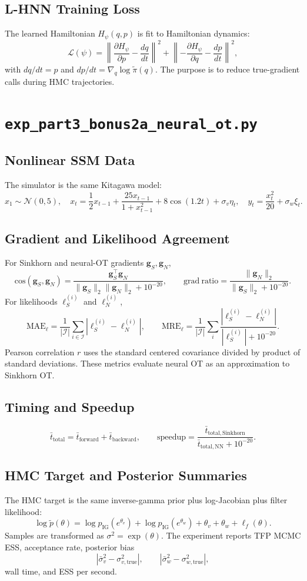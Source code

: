 \documentclass[11pt]{article}
\newcommand{\code}[1]{\texttt{#1}}
\begin{document}
\subsection*{L-HNN Training Loss}
The learned Hamiltonian \(H_\psi(q,p)\) is fit to Hamiltonian dynamics:
\[
\mathcal L(\psi)
=\left\|\frac{\partial H_\psi}{\partial p}-\frac{dq}{dt}\right\|^2
+\left\|-\frac{\partial H_\psi}{\partial q}-\frac{dp}{dt}\right\|^2,
\]
with \(dq/dt=p\) and \(dp/dt=\nabla_q\log\tilde\pi(q)\). The purpose is to reduce true-gradient calls during HMC trajectories.

\section{\code{exp\_part3\_bonus2a\_neural\_ot.py}}
\subsection*{Nonlinear SSM Data}
The simulator is the same Kitagawa model:
\[
x_1\sim\mathcal N(0,5),\quad
x_t=\frac12x_{t-1}+\frac{25x_{t-1}}{1+x_{t-1}^2}+8\cos(1.2t)+\sigma_v\eta_t,\quad
y_t=\frac{x_t^2}{20}+\sigma_w\xi_t.
\]

\subsection*{Gradient and Likelihood Agreement}
For Sinkhorn and neural-OT gradients \(\bm g_S,\bm g_N\),
\[
\mathrm{cos}(\bm g_S,\bm g_N)
=\frac{\bm g_S^\top\bm g_N}{\|\bm g_S\|_2\|\bm g_N\|_2+10^{-20}},
\qquad
\mathrm{grad\ ratio}=\frac{\|\bm g_N\|_2}{\|\bm g_S\|_2+10^{-20}}.
\]
For likelihoods \(\ell_S^{(i)}\) and \(\ell_N^{(i)}\),
\[
\mathrm{MAE}_{\ell}=\frac{1}{|\mathcal I|}\sum_{i\in\mathcal I}|\ell_S^{(i)}-\ell_N^{(i)}|,
\qquad
\mathrm{MRE}_{\ell}=\frac{1}{|\mathcal I|}\sum_i\frac{|\ell_S^{(i)}-\ell_N^{(i)}|}{|\ell_S^{(i)}|+10^{-20}}.
\]
Pearson correlation \(r\) uses the standard centered covariance divided by product of standard deviations. These metrics evaluate neural OT as an approximation to Sinkhorn OT.

\subsection*{Timing and Speedup}
\[
\bar t_{\mathrm{total}}=\bar t_{\mathrm{forward}}+\bar t_{\mathrm{backward}},
\qquad
\mathrm{speedup}=\frac{\bar t_{\mathrm{total,Sinkhorn}}}{\bar t_{\mathrm{total,NN}}+10^{-20}}.
\]

\subsection*{HMC Target and Posterior Summaries}
The HMC target is the same inverse-gamma prior plus log-Jacobian plus filter likelihood:
\[
\log\tilde p(\theta)
=\log p_{\mathrm{IG}}(e^{\theta_v})+\log p_{\mathrm{IG}}(e^{\theta_w})+\theta_v+\theta_w+\ell_f(\theta).
\]
Samples are transformed as \(\sigma^2=\exp(\theta)\). The experiment reports TFP MCMC ESS, acceptance rate, posterior bias
\[
|\bar\sigma_v^2-\sigma_{v,\mathrm{true}}^2|,\qquad
|\bar\sigma_w^2-\sigma_{w,\mathrm{true}}^2|,
\]
wall time, and ESS per second.
\end{document}
